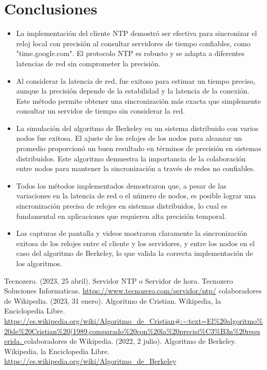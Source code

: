 \documentclass[a4paper,12pt]{report}
\begin{document}
\chapter{Conclusiones}
\begin{itemize}
    \item La implementación del cliente NTP demostró ser efectiva para sincronizar el reloj local con precisión al consultar servidores de tiempo confiables, como "time.google.com". El protocolo NTP es robusto y se adapta a diferentes latencias de red sin comprometer la precisión.

    \item Al considerar la latencia de red, fue exitoso para estimar un tiempo preciso, aunque la precisión depende de la estabilidad y la latencia de la conexión. Este método permite obtener una sincronización más exacta que simplemente consultar un servidor de tiempo sin considerar la red.

    \item  La simulación del algoritmo de Berkeley en un sistema distribuido con varios nodos fue exitosa. El ajuste de los relojes de los nodos para alcanzar un promedio proporcionó un buen resultado en términos de precisión en sistemas distribuidos. Este algoritmo demuestra la importancia de la colaboración entre nodos para mantener la sincronización a través de redes no confiables.

    \item Todos los métodos implementados demostraron que, a pesar de las variaciones en la latencia de red o el número de nodos, es posible lograr una sincronización precisa de relojes en sistemas distribuidos, lo cual es fundamental en aplicaciones que requieren alta precisión temporal.

    \item Las capturas de pantalla y videos mostraron claramente la sincronización exitosa de los relojes entre el cliente y los servidores, y entre los nodos en el caso del algoritmo de Berkeley, lo que valida la correcta implementación de los algoritmos.

\end{itemize}

\begin{thebibliography}{99}
 Tecnozero. (2023, 25 abril). Servidor NTP o Servidor de hora. Tecnozero Soluciones Informaticas. \url{https://www.tecnozero.com/servidor/ntp/}
 colaboradores de Wikipedia. (2023, 31 enero). Algoritmo de Cristian. Wikipedia, la Enciclopedia Libre. \url{https://es.wikipedia.org/wiki/Algoritmo_de_Cristian#:~:text=El%20algoritmo%20de%20Cristian%20(1989,comparado%20con%20la%20precisi%C3%B3n%20requerida. }
 colaboradores de Wikipedia. (2022, 2 julio). Algoritmo de Berkeley. Wikipedia, la Enciclopedia Libre. \url{https://es.wikipedia.org/wiki/Algoritmo_de_Berkeley}

\end{thebibliography}
\end{document}
